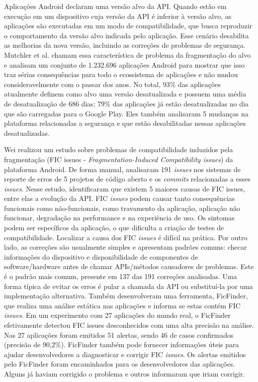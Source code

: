 Aplicações Android declaram uma versão alvo da API. Quando estão em execução em
um dispositivo cuja versão da API é inferior à versão alvo, as aplicações são
executadas em um modo de compatibilidade, que busca reproduzir o comportamento
da versão alvo indicada pelo aplicação. Esse cenário desabilita as melhorias da
nova versão, incluindo as correções de problemas de segurança. Mutchler et al.
\cite{Mutchler2016}
chamam essa característica de problema da fragmentação do alvo e analisam um
conjunto de 1.232.696 aplicações Android para mostrar que isso traz sérias
consequências para todo o ecossistema de aplicações e não mudou consideravelmente
com o 
passar dos anos. No total, 93\% das aplicações atualmente definem como alvo uma
versão desatualizada e possuem uma média de desatualização de 686 dias; 79\% das
aplicações já estão desatualizadas no dia que são carregadas para o Google Play.
Eles também analisaram 5 mudanças na plataforma relacionadas a segurança e que estão
desabilitadas nessas aplicações desatualizadas.

Wei \cite{Wei2016} realizou um estudo sobre problemas de compatibilidade induzidos
pela fragmentação 
(FIC issues - \textit{Fragmentation-Induced Compatibility issues}) da plataforma
Android.
De forma manual, analisaram 191 \textit{issues} nos sistemas de reporte de erros
de 5 projetos de código aberto e os \textit{commits} relacionadas a esses \textit{issues}.
Nesse estudo, identificaram que existem 5 maiores causas de FIC issues, entre elas
a evolução da API. FIC \textit{issues} podem causar tanto consequências funcionais como
não-funcionais, como travamento da aplicação, aplicação não funcionar, degradação
na performance e na experiência de uso. Os sintomas podem ser específicos da aplicação,
o que dificulta a criação de testes de compatibilidade. Localizar a causa dos FIC
\textit{issues} é difícil na prática. Por outro lado, as correções são usualmente
simples e apresentam padrões comuns: checar informações do dispositivo e disponibilidade
de componentes de software/hardware antes de chamar APIs/métodos causadores de
problemas. Este é o padrão mais comum, presente em 137 das 191 correções analisadas.
Uma forma típica de evitar os erros é pular a chamada da API ou substituí-la por
uma implementação alternativa. Também desenvolveram uma ferramenta, FicFinder, que
realiza uma análise estática nas aplicações e informa se estas contém FIC
\textit{issues}. Em um experimento com 27 aplicações do mundo real, o FicFinder
efetivamente detectou FIC issues desconhecidos com
uma alta precisão na análise. Nas 27 aplicações foram emitidos 51 alertas, sendo
46 de casos confirmados (precisão de 90,2\%). FicFinder também pode fornecer
informações úteis para ajudar desenvolvedores a diagnosticar e corrigir FIC
\textit{issues}. Os alertas emitidos pelo FicFinder foram encaminhados para os
desenvolvedores das aplicações. Alguns já haviam corrigido o problema e outros
informaram que iriam corrigir.

